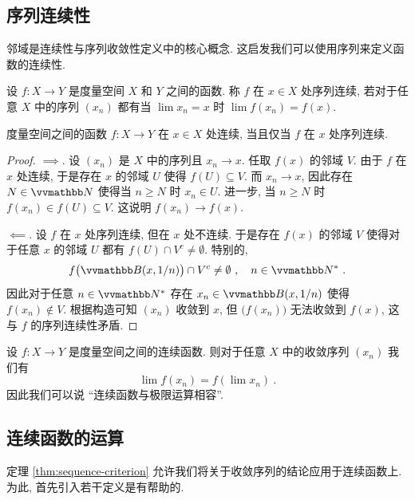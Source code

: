 \subsection{序列连续性}

邻域是连续性与序列收敛性定义中的核心概念. 这启发我们可以使用序列来定义函数的连续性.

\begin{definition}[序列连续性]
    设 \(f \colon X \to Y\) 是度量空间 \(X\) 和 \(Y\) 之间的函数. 称 \(f\) 在 \(x \in X\) 处序列连续, 若对于任意 \(X\) 中的序列 \((x_n)\) 都有当 \(\lim x_n = x\) 时 \(\lim f(x_n) = f(x)\).
\end{definition}

\begin{theorem}\label{thm:sequence-criterion}
    度量空间之间的函数 \(f \colon X \to Y\) 在 \(x \in X\) 处连续, 当且仅当 \(f\) 在 \(x\) 处序列连续.
\end{theorem}

\begin{proof}
    \(\implies\). 设 \((x_n)\) 是 \(X\) 中的序列且 \(x_n \to x\). 任取 \(f(x)\) 的邻域 \(V\). 由于 \(f\) 在 \(x\) 处连续, 于是存在 \(x\) 的邻域 \(U\) 使得 \(f(U) \subseteq V\). 而 \(x_n \to x\), 因此存在 \(N \in \N\) 使得当 \(n \geq N\) 时 \(x_n \in U\). 进一步, 当 \(n \geq N\) 时 \(f(x_n) \in f(U) \subseteq V\). 这说明 \(f(x_n) \to f(x)\).

    \(\impliedby\). 设 \(f\) 在 \(x\) 处序列连续, 但在 \(x\) 处不连续. 于是存在 \(f(x)\) 的邻域 \(V\) 使得对于任意 \(x\) 的邻域 \(U\) 都有 \(f(U) \cap V^c \neq \emptyset\). 特别的,
    \[
        f\bigl(\B(x, 1 / n)\bigr) \cap V^c \neq \emptyset\ ,\quad n \in \N^\ast\ .
    \]
    因此对于任意 \(n \in \N^\ast\) 存在 \(x_n \in \B(x, 1 / n)\) 使得 \(f(x_n) \notin V\). 根据构造可知 \((x_n)\) 收敛到 \(x\), 但 \(\bigl(f(x_n)\bigr)\) 无法收敛到 \(f(x)\), 这与 \(f\) 的序列连续性矛盾.
\end{proof}

设 \(f \colon X \to Y\) 是度量空间之间的连续函数. 则对于任意 \(X\) 中的收敛序列 \((x_n)\) 我们有
\[
    \lim f(x_n) = f(\lim x_n)\ .
\]
因此我们可以说 ``连续函数与极限运算相容''.

\subsection{连续函数的运算}

定理 \ref{thm:sequence-criterion} 允许我们将关于收敛序列的结论应用于连续函数上. 为此, 首先引入若干定义是有帮助的.

